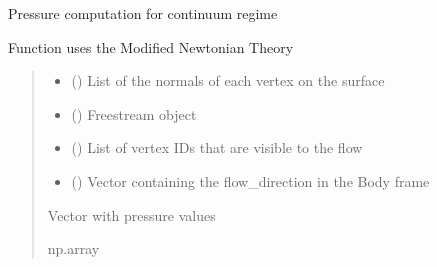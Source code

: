 \documentclass[letterpaper,10pt,english]{sphinxmanual}
\begin{document}

\begin{fulllineitems}
\label{\detokenize{modules:aerothermo.aerodynamics_module_continuum}}
\pysigstartsignatures
{}
\pysigstopsignatures
\sphinxAtStartPar
Pressure computation for continuum regime

\sphinxAtStartPar
Function uses the Modified Newtonian Theory
\begin{quote}\begin{description}
\begin{itemize}
\item {} 
\sphinxAtStartPar
{} () \textendash{} List of the normals of each vertex on the surface

\item {} 
\sphinxAtStartPar
{} () \textendash{} Freestream object

\item {} 
\sphinxAtStartPar
{} () \textendash{} List of vertex IDs that are visible to the flow

\item {} 
\sphinxAtStartPar
{} () \textendash{} Vector containing the flow\_direction in the Body frame

\end{itemize}

\sphinxAtStartPar
{} \textendash{} Vector with pressure values

\sphinxAtStartPar
np.array

\end{description}\end{quote}

\end{fulllineitems}
\end{document}
